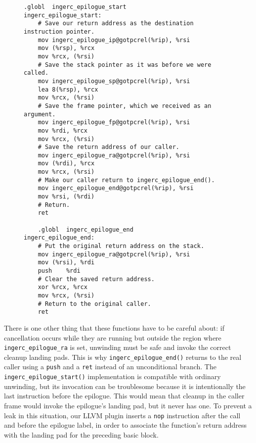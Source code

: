 \begin{figure}
\begin{lstlisting}[label=lst:epilogue,language={[x86masm]Assembler},caption={[Code to support time travel out of the epilogue]Code to support time travel out of the epilogue. The \texttt{@gotpcrel} relocations are position-independent GOT lookups of the globals' addresses.}]
	.globl	ingerc_epilogue_start
ingerc_epilogue_start:
	# Save our return address as the destination instruction pointer.
	mov	ingerc_epilogue_ip@gotpcrel(%rip), %rsi
	mov	(%rsp), %rcx
	mov	%rcx, (%rsi)
	# Save the stack pointer as it was before we were called.
	mov	ingerc_epilogue_sp@gotpcrel(%rip), %rsi
	lea	8(%rsp), %rcx
	mov	%rcx, (%rsi)
	# Save the frame pointer, which we received as an argument.
	mov	ingerc_epilogue_fp@gotpcrel(%rip), %rsi
	mov	%rdi, %rcx
	mov	%rcx, (%rsi)
	# Save the return address of our caller.
	mov	ingerc_epilogue_ra@gotpcrel(%rip), %rsi
	mov	(%rdi), %rcx
	mov	%rcx, (%rsi)
	# Make our caller return to ingerc_epilogue_end().
	mov	ingerc_epilogue_end@gotpcrel(%rip), %rsi
	mov	%rsi, (%rdi)
	# Return.
	ret

	.globl	ingerc_epilogue_end
ingerc_epilogue_end:
	# Put the original return address on the stack.
	mov	ingerc_epilogue_ra@gotpcrel(%rip), %rsi
	mov	(%rsi), %rdi
	push	%rdi
	# Clear the saved return address.
	xor	%rcx, %rcx
	mov	%rcx, (%rsi)
	# Return to the original caller.
	ret
\end{lstlisting}
\end{figure}

\begin{sloppypar}
There is one other thing that these functions have to be careful about:\@
if cancellation occurs while they are running but outside the region where
\texttt{ingerc\_epilogue\_ra} is set, unwinding must be safe and invoke the correct
cleanup landing pads.  This is why \texttt{ingerc\_epilogue\_end()} returns to the
real caller using a \texttt{push} and a \texttt{ret} instead of an unconditional
branch.  The \texttt{ingerc\_epilogue\_start()} implementation is compatible with
ordinary unwinding, but its invocation can be troublesome because it is
intentionally the last instruction before the epilogue.  This would mean that cleanup
in the caller frame would invoke the epilogue's landing pad, but it never has one.
To prevent a leak in this situation, our LLVM plugin inserts a \texttt{nop}
instruction after the call and before the epilogue label, in order to associate the
function's return address with the landing pad for the
preceding basic block.
\end{sloppypar}


